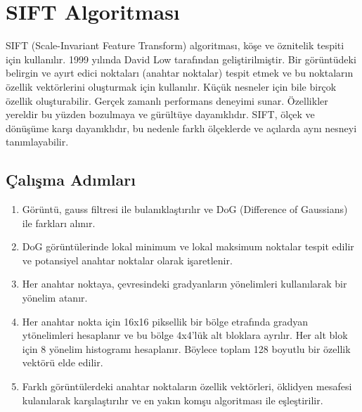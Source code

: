 \section{SIFT Algoritması}

SIFT (Scale-Invariant Feature Transform) algoritması, köşe ve öznitelik tespiti için kullanılır. 1999 yılında David Low tarafından geliştirilmiştir. Bir görüntüdeki belirgin ve ayırt edici noktaları (anahtar noktalar) tespit etmek ve bu noktaların özellik vektörlerini oluşturmak için kullanılır. Küçük nesneler için bile birçok özellik oluşturabilir. Gerçek zamanlı performans deneyimi sunar. Özellikler yereldir bu yüzden bozulmaya ve gürültüye dayanıklıdır. SIFT, ölçek ve dönüşüme karşı dayanıklıdır, bu nedenle farklı ölçeklerde ve açılarda aynı nesneyi tanımlayabilir.

\subsection{Çalışma Adımları}
\begin{enumerate}
	\item Görüntü, gauss filtresi ile bulanıklaştırılır ve DoG (Difference of Gaussians) ile farkları alınır.
	\item DoG görüntülerinde lokal minimum ve lokal maksimum noktalar tespit edilir ve potansiyel anahtar noktalar olarak işaretlenir.
	\item Her anahtar noktaya, çevresindeki gradyanların yönelimleri kullanılarak bir yönelim atanır.
	\item Her anahtar nokta için 16x16 piksellik bir bölge etrafında gradyan ytönelimleri hesaplanır ve bu bölge 4x4'lük alt bloklara ayrılır. Her alt blok için 8 yönelim histogramı hesaplanır. Böylece toplam 128 boyutlu bir özellik vektörü elde edilir.
	\item Farklı görüntülerdeki anahtar noktaların özellik vektörleri, öklidyen mesafesi kulanılarak karşılaştırılır ve en yakın komşu algoritması ile eşleştirilir.
\end{enumerate}


\newpage